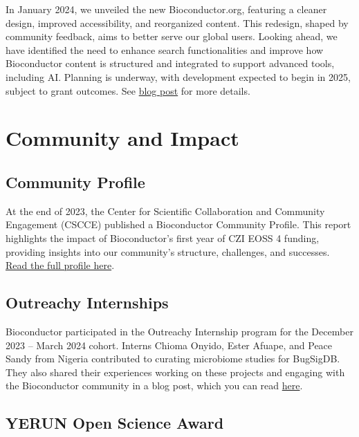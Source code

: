In January 2024, we unveiled the new Bioconductor.org, featuring a cleaner design, improved accessibility, and reorganized content. This redesign, shaped by community feedback, aims to better serve our global users. Looking ahead, we have identified the need to enhance search functionalities and improve how Bioconductor content is structured and integrated to support advanced tools, including AI. Planning is underway, with development expected to begin in 2025, subject to grant outcomes. See \href{https://blog.bioconductor.org/posts/2024-02-01-website-update/}{blog post} for more details.

\section{Community and Impact}\label{community-and-impact}

\subsection{Community Profile}\label{community-profile}

At the end of 2023, the Center for Scientific Collaboration and Community Engagement (CSCCE) published a Bioconductor Community Profile. This report highlights the impact of Bioconductor's first year of CZI EOSS 4 funding, providing insights into our community's structure, challenges, and successes. \href{https://zenodo.org/records/8400205}{Read the full profile here}.

\subsection{Outreachy Internships}\label{outreachy-internships}

Bioconductor participated in the Outreachy Internship program for the December 2023 -- March 2024 cohort. Interns Chioma Onyido, Ester Afuape, and Peace Sandy from Nigeria contributed to curating microbiome studies for BugSigDB. They also shared their experiences working on these projects and engaging with the Bioconductor community in a blog post, which you can read \href{https://blog.bioconductor.org/posts/2024-01-31-OutreachyInternshipJourney/}{here}.

\subsection{YERUN Open Science Award}\label{yerun-open-science-award}

